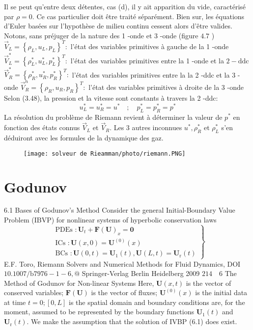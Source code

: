 Il se peut qu'entre deux détentes, cas (d), il y ait apparition du vide, caractérisé par $\rho=0 .$ Ce cas particulier doit être traité séparément. Bien sur, les équations d'Euler basées sur l'hypothèse de milieu continu cessent alors d'être valides.
Notons, sans préjuger de la nature des 1 -onde et 3 -onde (figure $4.7$ ) $\vec{V}_{L}=\left\{\rho_{L}, u_{L}, p_{L}\right\}^{T}:$ l'état des variables primitives à gauche de la 1 -onde $\vec{V}_{L}^{*}=\left\{\rho_{L}^{*}, u_{L}^{*}, p_{L}^{*}\right\}^{T}:$ l'état des variables primitives entre la 1 -onde et la $2-\mathrm{ddc}$ $\vec{V}_{R}^{*}=\left\{\rho_{R}^{*}, u_{R}^{*}, p_{R}^{*}\right\}^{T}:$ l'état des variables primitives entre la la 2 -ddc et la 3 -onde $\vec{V}_{R}^{n}=\left\{\rho_{R}, u_{R}, p_{R}\right\}^{T}:$ l'état des variables primitives à droite de la 3 -onde \\
Selon (3.48), la pression et la vitesse sont constants à travers la 2 -ddc:
$$u_{L}^{*}=u_{R}^{*}=u^{*} \quad ; \quad p_{L}^{*}=p_{R}^{*}=p^{*}$$
La résolution du problème de Riemann revient à déterminer la valeur de $p^{*}$ en fonction des états connus $\vec{V}_{L}$ et $\vec{V}_{R}$. Les 3 autres inconnues $u^{*}, \rho_{R}^{*}$ et $\rho_{L}^{*}$ s'en déduiront avec les formules de la dynamique des gaz.
\begin{figure}[H]
\begin{center}
        \texttt{[image: solveur de Rieamman/photo/riemann.PNG]}
\caption{}
\end{center}
\end{figure}

\section{Godunov}

6.1 Bases of Godunov's Method
Consider the general Initial-Boundary Value Problem (IBVP) for nonlinear systems of hyperbolic conservation laws
$$
\left.\begin{array}{l}
\text { PDEs }: \mathbf{U}_{t}+\mathbf{F}(\mathbf{U})_{x}=\mathbf{0} \\
\text { ICs }: \mathbf{U}(x, 0)=\mathbf{U}^{(0)}(x) \\
\text { BCs }: \mathbf{U}(0, t)=\mathbf{U}_{1}(t), \mathbf{U}(L, t)=\mathbf{U}_{\mathrm{r}}(t)
\end{array}\right\}
$$
E.F. Toro, Riemann Solvers and Numerical Methods for Fluid Dynamics, DOI $10.1007 / \mathrm{b} 7976-1-6, @$ Springer-Verlag Berlin Heidelberg 2009
$214 \quad 6$ The Method of Godunov for Non-linear Systems
Here, $\mathbf{U}(x, t)$ is the vector of conserved variables; $\mathbf{F}(\mathbf{U})$ is the vector of fluxes; $\mathbf{U}^{(0)}(x)$ is the initial data at time $t=0 ;[0, L]$ is the spatial domain and boundary conditions are, for the moment, assumed to be represented by the boundary functions $\mathbf{U}_{1}(t)$ and $\mathbf{U}_{\mathrm{r}}(t) .$ We make the assumption that the solution of IVBP (6.1) does exist.

